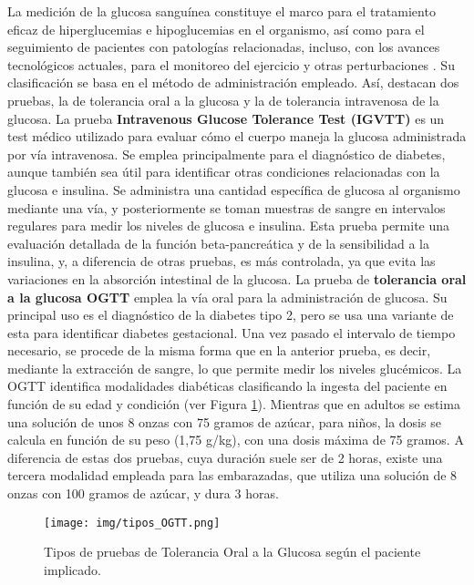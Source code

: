 La medición de la glucosa sanguínea constituye el marco para el tratamiento eficaz de hiperglucemias e hipoglucemias en el organismo, así como para el seguimiento de pacientes con patologías relacionadas, incluso, con los avances tecnológicos actuales, para el monitoreo del ejercicio y otras perturbaciones \cite{gygliola2020glucose}. Su clasificación se basa en el método de administración empleado. Así, destacan dos pruebas, la de tolerancia oral a la glucosa y la de tolerancia intravenosa de la glucosa.
La prueba \textbf{Intravenous Glucose Tolerance Test (IGVTT)} es un test médico utilizado para evaluar cómo el cuerpo maneja la glucosa administrada por vía intravenosa. Se emplea principalmente para el diagnóstico de diabetes, aunque también sea útil para identificar otras condiciones relacionadas con la glucosa e insulina. Se administra una cantidad específica de glucosa al organismo mediante una vía, y posteriormente se toman muestras de sangre en intervalos regulares para medir los niveles de glucosa e insulina. Esta prueba permite una evaluación detallada de la función beta-pancreática y de la sensibilidad a la insulina, y, a diferencia de otras pruebas, es más controlada, ya que evita las variaciones en la absorción intestinal de la glucosa.\label{sec:IGVTT} 
La prueba de \textbf{tolerancia oral a la glucosa OGTT} emplea la vía oral para la administración de glucosa. Su principal uso es el diagnóstico de la diabetes tipo 2, pero se usa una variante de esta para identificar diabetes gestacional. Una vez pasado el intervalo de tiempo necesario, se procede de la misma forma que en la anterior prueba, es decir, mediante la extracción de sangre, lo que permite medir los niveles glucémicos. La OGTT identifica modalidades diabéticas clasificando la ingesta del paciente en función de su edad y condición (ver Figura \ref{fig:tipos_OGTT}).  Mientras que en adultos se estima una solución de unos 8 onzas con 75 gramos de azúcar, para niños, la dosis se calcula en función de su peso (1,75 g/kg), con una dosis máxima de 75 gramos. A diferencia de estas dos pruebas, cuya duración suele ser de 2 horas, existe una tercera modalidad empleada para las embarazadas, que utiliza una solución de 8 onzas con 100 gramos de azúcar, y dura 3 horas. \label{sec:OGTT}
\clearpage
\begin{figure}[htbp]
    \centering
    \texttt{[image: img/tipos\_OGTT.png]}
    \caption{Tipos de pruebas de Tolerancia Oral a la Glucosa según el paciente implicado.}
    \label{fig:tipos_OGTT}
\end{figure}

